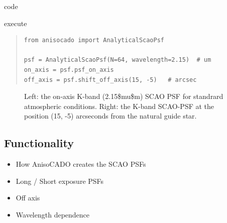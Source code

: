 \label{code-anisocado-example}
\begin{DUclass}{code}
\begin{DUclass}{execute}
\begin{quote}
\begin{alltt}
\begin{lstlisting}[frame=single]
from anisocado import AnalyticalScaoPsf

psf = AnalyticalScaoPsf(N=64, wavelength=2.15)  # um
on_axis = psf.psf_on_axis
off_axis = psf.shift_off_axis(15, -5)   # arcsec
\end{lstlisting}
\end{alltt}
\end{quote}
\end{DUclass}
\end{DUclass}


\begin{figure}[H]
\noindent{}\label{fig-anisocado-basic-example}

\caption{Left: the on-axis K-band (2.15\$mu\$m) SCAO PSF for standrard atmospheric conditions.
Right: the K-band SCAO-PSF at the position (15, -5) arcseconds from the natural guide star.}
\end{figure}


\subsection{Functionality%
  \label{functionality}%
}

\begin{itemize}
\item How AnisoCADO creates the SCAO PSFs

\item Long / Short exposure PSFs

\item Off axis

\item Wavelength dependence
\end{itemize}
